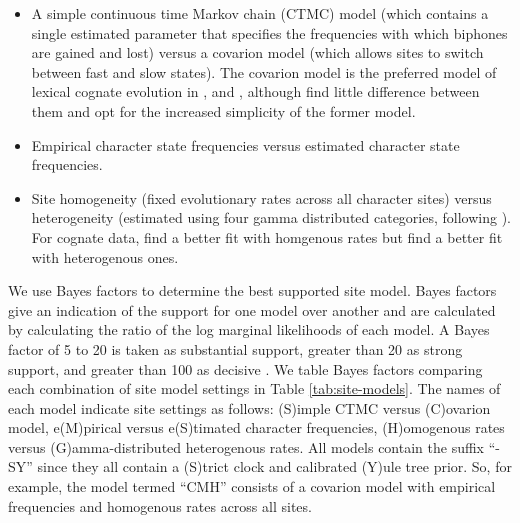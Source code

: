 \begin{itemize}
\tightlist
\item
  A simple continuous time Markov chain (CTMC) model (which contains a single estimated parameter that specifies the frequencies with which biphones are gained and lost) versus a covarion model (which allows sites to switch between fast and slow states). The covarion model is the preferred model of lexical cognate evolution in \textcite{bouckaert_corrections_2012}, \textcite{bouckaert_origin_2018} and \textcite{kolipakam_bayesian_2018}, although \textcite[p.~219]{chang_ancestry-constrained_2015} find little difference between them and opt for the increased simplicity of the former model.
\item
  Empirical character state frequencies versus estimated character state frequencies.
\item
  Site homogeneity (fixed evolutionary rates across all character sites) versus heterogeneity (estimated using four gamma distributed categories, following \textcite{kolipakam_bayesian_2018}). For cognate data, \textcite{bouckaert_origin_2018} find a better fit with homgenous rates but \textcite{kolipakam_bayesian_2018} find a better fit with heterogenous ones.
\end{itemize}

We use Bayes factors to determine the best supported site model. Bayes factors give an indication of the support for one model over another and are calculated by calculating the ratio of the log marginal likelihoods of each model. A Bayes factor of 5 to 20 is taken as substantial support, greater than 20 as strong support, and greater than 100 as decisive \autocite{kass_bayes_1995}. We table Bayes factors comparing each combination of site model settings in Table \ref{tab:site-models}. The names of each model indicate site settings as follows: (S)imple CTMC versus (C)ovarion model, e(M)pirical versus e(S)timated character frequencies, (H)omogenous rates versus (G)amma-distributed heterogenous rates. All models contain the suffix ``-SY'' since they all contain a (S)trict clock and calibrated (Y)ule tree prior. So, for example, the model termed ``CMH'' consists of a covarion model with empirical frequencies and homogenous rates across all sites.

